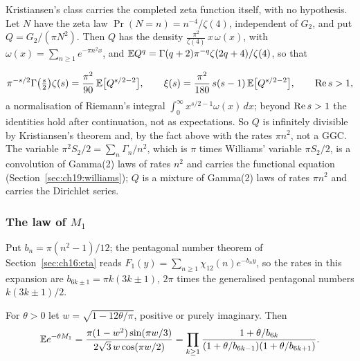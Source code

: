 \begin{remark}
\begin{resultpar}\label{res:maxexp:zetaq}Kristiansen's class carries the completed zeta function itself, with no hypothesis. Let $N$ have the zeta law $\Pr(N=n)=n^{-4}/\zeta(4)$, independent of $G_2$, and put $Q=G_2/(\pi N^2)$. Then $Q$ has the density $\frac{\pi^2}{\zeta(4)}\,x\,\omega(x)$, with $\omega(x)=\sum_{n\ge1}e^{-\pi n^2x}$, and $\mathbb{E} Q^q=\Gamma(q+2)\pi^{-q}\zeta(2q+4)/\zeta(4)$, so that\end{resultpar}
\[
\pi^{-s/2}\Gamma\bigl(\tfrac s2\bigr)\zeta(s)=\frac{\pi^2}{90}\,\mathbb{E}\bigl[Q^{s/2-2}\bigr],\qquad\xi(s)=\frac{\pi^2}{180}\,s(s-1)\,\mathbb{E}\bigl[Q^{s/2-2}\bigr],\qquad\operatorname{Re} s>1,
\]
a normalisation of Riemann's integral $\int_0^\infty x^{s/2-1}\omega(x)\,dx$; beyond $\operatorname{Re} s>1$ the identities hold after continuation, not as expectations. So $Q$ is infinitely divisible by Kristiansen's theorem and, by the fact above with the rates $\pi n^2$, not a GGC. The variable $\pi^2S_2/2=\sum_n\Gamma_n/n^2$, which is $\pi$ times Williams' variable $\pi S_2/2$, is a convolution of Gamma(2) laws of rates $n^2$ and carries the functional equation (Section~\ref{sec:ch19:williams}); $Q$ is a mixture of Gamma(2) laws of rates $\pi n^2$ and carries the Dirichlet series.
\end{remark}

\subsubsection{The law of \texorpdfstring{$M_1$}{M1}}\label{sec:maxexp:M1}

Put $b_n=\pi(n^2-1)/12$; the pentagonal number theorem of Section~\ref{sec:ch16:eta} reads $F_1(y)=\sum_{n\ge1}\chi_{12}(n)e^{-b_ny}$, so the rates in this expansion are $b_{6k\pm1}=\pi k(3k\pm1)$, $2\pi$ times the generalised pentagonal numbers $k(3k\pm1)/2$.

\begin{proposition}\label{prop:ch16:M1}
For $\theta>0$ let $w=\sqrt{1-12\theta/\pi}$, positive or purely imaginary. Then
\[
\mathbb{E} e^{-\theta M_1}=\frac{\pi(1-w^2)\sin(\pi w/3)}{2\sqrt3\,w\cos(\pi w/2)}=\prod_{k\ge1}\frac{1+\theta/b_{6k}}{(1+\theta/b_{6k-1})(1+\theta/b_{6k+1})}.
\]
\end{proposition}

